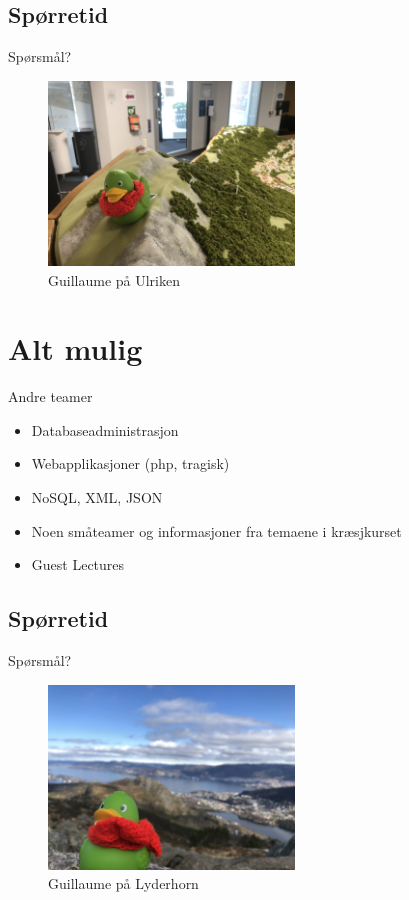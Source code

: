 \subsection*{Spørretid}
\begin{frame}{Spørsmål?}
    \begin{figure}
        \centering
        \includegraphics[height = 4.9cm]{images/guillaume11.jpg}
        \caption{Guillaume på Ulriken}
        \label{fig:guillaume11}
    \end{figure}
\end{frame}


\section{Alt mulig}
\begin{frame}{Andre teamer}
\begin{itemize}
    \item Databaseadministrasjon
    \item Webapplikasjoner (php, tragisk)
    \item NoSQL, XML, JSON
    \item Noen småteamer og informasjoner fra temaene i kræsjkurset
    \item Guest Lectures
\end{itemize}
\end{frame}

\subsection*{Spørretid}
\begin{frame}{Spørsmål?}
    \begin{figure}
        \centering
        \includegraphics[height = 4.9cm]{images/guillaume8.jpg}
        \caption{Guillaume på Lyderhorn}
        \label{fig:guillaume8}
    \end{figure}
\end{frame}


